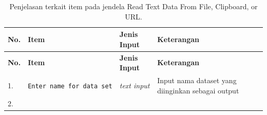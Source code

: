 \documentclass[12pt,]{krantz}
\begin{document}
\begin{longtable}[]{@{}llll@{}}
\caption{\label{tab:readpltext} Penjelasan terkait item pada jendela Read Text Data From File, Clipboard, or URL.}\tabularnewline
\toprule
\begin{minipage}[b]{0.04\columnwidth}\raggedright
\textbf{No.}\strut
\end{minipage} & \begin{minipage}[b]{0.17\columnwidth}\raggedright
\textbf{Item}\strut
\end{minipage} & \begin{minipage}[b]{0.10\columnwidth}\raggedright
\textbf{Jenis Input}\strut
\end{minipage} & \begin{minipage}[b]{0.58\columnwidth}\raggedright
\textbf{Keterangan}\strut
\end{minipage}\tabularnewline
\midrule
\endfirsthead
\toprule
\begin{minipage}[b]{0.04\columnwidth}\raggedright
\textbf{No.}\strut
\end{minipage} & \begin{minipage}[b]{0.17\columnwidth}\raggedright
\textbf{Item}\strut
\end{minipage} & \begin{minipage}[b]{0.10\columnwidth}\raggedright
\textbf{Jenis Input}\strut
\end{minipage} & \begin{minipage}[b]{0.58\columnwidth}\raggedright
\textbf{Keterangan}\strut
\end{minipage}\tabularnewline
\midrule
\endhead
\begin{minipage}[t]{0.04\columnwidth}\raggedright
1.\strut
\end{minipage} & \begin{minipage}[t]{0.17\columnwidth}\raggedright
\texttt{Enter\ name\ for\ data\ set}\strut
\end{minipage} & \begin{minipage}[t]{0.10\columnwidth}\raggedright
\emph{text input}\strut
\end{minipage} & \begin{minipage}[t]{0.58\columnwidth}\raggedright
Input nama dataset yang diinginkan sebagai output\strut
\end{minipage}\tabularnewline
\begin{minipage}[t]{0.04\columnwidth}\raggedright
2.\strut
\end{minipage} & \begin{minipage}[t]{0.17\columnwidth}\raggedright

\end{minipage}
\end{longtable}
\end{document}
